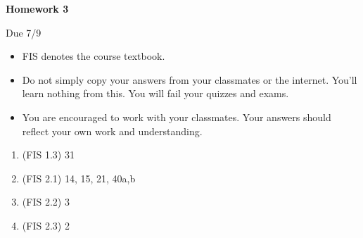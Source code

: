 \documentclass{article}
\begin{document}
\begin{center}
    {\bf Homework 3}
    
    Due 7/9
\end{center}

\begin{itemize}
    \item 
        FIS denotes the course textbook.
    \item
        Do not simply copy your answers from your classmates or the internet.
        You'll learn nothing from this. You will fail your quizzes and exams.
    \item
        You are encouraged to work with your classmates. Your answers
        should reflect your own work and understanding.
\end{itemize}

\begin{enumerate}
        \item 
            (FIS 1.3) 31
        \item 
            (FIS 2.1) 14, 15, 21, 40a,b
        \item
            (FIS 2.2) 3
        \item
            (FIS 2.3) 2
\end{enumerate}
    
\end{document}
